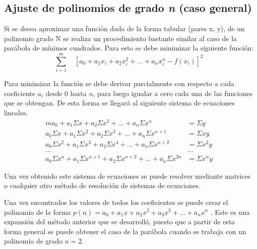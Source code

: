 \documentclass[11pt,letterpaper]{article}
\begin{document}
\subsection{Ajuste de polinomios de grado \textit{n}	 (caso general)}
Si se desea aproximar una función dada de la forma tabular (pares x, y), de un polinomio grado N se realiza un procedimiento bastante similar al caso de la parábola de mínimos cuadrados. Para esto se debe minimizar la siguiente función:
\begin{equation} \label{	equation:ajustte}
	\sum_{i=1}^{m} \quad [ a_0 + a_1x_i + a_2x_i^2 + \dots + a_nx_i^n - f(x_i)] ^ 2
\end{equation}
\par
Para minimizar la función se debe derivar parcialmente con respecto a cada coeficiente $a_i$ desde 0 hasta $n$, para luego igualar a cero cada una de las funciones que se obtengan. De esta forma se llegará al siguiente sistema de ecuaciones lineales.
\begin{align*}
	ma_0 + a_1\Sigma x + a_2\Sigma x^2 + \dots + a_n\Sigma x^n &= \Sigma y \\
	a_0\Sigma x + a_1\Sigma x^2 + a_2\Sigma x^3 + \dots + a_n\Sigma x^{n+1} &= \Sigma xy\\
	a_0\Sigma x ^2 + a_1\Sigma x^3 + a_2\Sigma x^4 + \dots + a_n\Sigma x^{n+2} &= \Sigma x^2y \\
	\dots  & \dots \\
	a_0\Sigma x^n + a_1\Sigma x^{n+1} + a_2\Sigma x^{n+2} + \dots + a_n\Sigma x^{2n} &= \Sigma  x^ny
\end{align*}
\par
Una vez obtenido este sistema de ecuaciones se puede resolver mediante matrices o cualquier otro método de resolución de sistemas de ecuaciones.
\par  Una vez encontrados los valores de todos los coeficientes se puede crear el polinomio de la forma  $p(n) = a_0 + a_1x + a_2x^2 + a_3x^3 + \dots + a_nx^n$ . Este es una expansión del método anterior que se desarrolló, puesto que a partir de esta forma general se puede obtener el caso de la parábola cuando se trabaja con un polinomio de grado $n = 2$.
\cite{nieves2011metodos}




\end{document}
